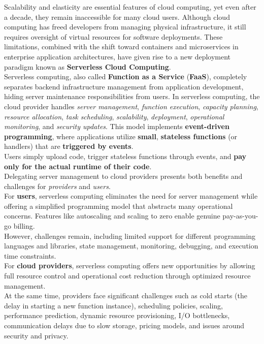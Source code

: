 Scalability and elasticity are essential features of cloud computing, yet even after a decade, they remain inaccessible for many cloud users. Although cloud computing has freed developers from managing physical infrastructure, it still requires oversight of virtual resources for software deployments. These limitations, combined with the shift toward containers and microservices in enterprise application architectures, have given rise to a new deployment paradigm known as \textbf{Serverless Cloud Computing}.\vspace{14pt}\\
Serverless computing, also called \textbf{Function as a Service} (\textbf{FaaS}), completely separates backend infrastructure management from application development, hiding server maintenance responsibilities from users. In serverless computing, the cloud provider handles \textit{server management}, \textit{function execution}, \textit{capacity planning}, \textit{resource allocation}, \textit{task scheduling}, \textit{scalability}, \textit{deployment}, \textit{operational monitoring}, and \textit{security updates}. This model implements \textbf{event-driven programming}, where applications utilize \textbf{small}, \textbf{stateless functions} (or handlers) that are \textbf{triggered by events}.\\
Users simply upload code, trigger stateless functions through events, and \textbf{pay only for the actual runtime of their code}.\vspace{14pt}\\
Delegating server management to cloud providers presents both benefits and challenges for \textit{providers} and \textit{users}.\vspace{14pt}\\
For \textbf{users}, serverless computing eliminates the need for server management while offering a simplified programming model that abstracts many operational concerns. Features like autoscaling and scaling to zero enable genuine pay-as-you-go billing.\\
However, challenges remain, including limited support for different programming languages and libraries, state management, monitoring, debugging, and execution time constraints.\vspace{14pt}\\
For \textbf{cloud providers}, serverless computing offers new opportunities by allowing full resource control and operational cost reduction through optimized resource management.\\
At the same time, providers face significant challenges such as cold starts (the delay in starting a new function instance), scheduling policies, scaling, performance prediction, dynamic resource provisioning, I/O bottlenecks, communication delays due to slow storage, pricing models, and issues around security and privacy.\cite{banaei2022etas}